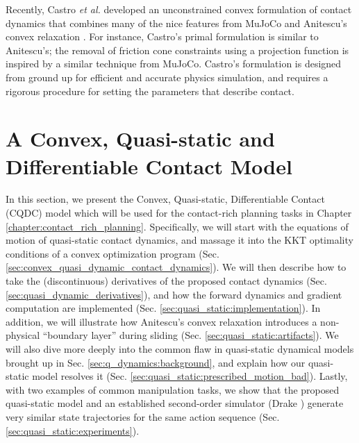 Recently, Castro \textit{et al.} developed an unconstrained convex formulation of contact dynamics \cite{castro2021unconstrained} that combines many of the nice features from MuJoCo \cite{todorov2012mujoco} and Anitescu's convex relaxation \cite{anitescu2006optimization}. For instance, Castro's primal formulation is similar to Anitescu's; the removal of friction cone constraints using a projection function is inspired by a similar technique from MuJoCo. 
Castro's formulation is designed from ground up for efficient and accurate physics simulation, and requires a rigorous procedure for setting the parameters that describe contact.


\section{A Convex, Quasi-static and Differentiable Contact Model} \label{sec:q_dynamics:cqdc}
In this section, we present the Convex, Quasi-static, Differentiable Contact (CQDC) model which will be used for the contact-rich planning tasks in Chapter \ref{chapter:contact_rich_planning}. Specifically, we will start with the equations of motion of quasi-static contact dynamics, and massage it into the KKT optimality conditions of a convex optimization program (Sec. \ref{sec:convex_quasi_dynamic_contact_dynamics}). We will then describe how to take the (discontinuous) derivatives of the proposed contact dynamics (Sec. \ref{sec:quasi_dynamic_derivatives}), and how the forward dynamics and gradient computation are implemented (Sec. \ref{sec:quasi_static:implementation}). In addition, we will illustrate how Anitescu's convex relaxation introduces a non-physical ``boundary layer'' during sliding (Sec. \ref{sec:quasi_static:artifacts}). We will also dive more deeply into the common flaw in quasi-static dynamical models brought up in Sec. \ref{sec:q_dynamics:background}, and explain how our quasi-static model resolves it (Sec. \ref{sec:quasi_static:prescribed_motion_bad}). Lastly, with two examples of common manipulation tasks, we show that the proposed quasi-static model and an established second-order simulator (Drake \cite{drake}) generate very similar state trajectories for the same action sequence (Sec. \ref{sec:quasi_static:experiments}). 

